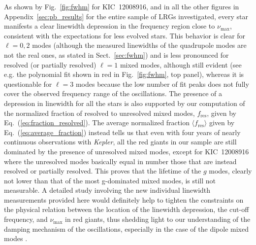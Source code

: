 \documentclass[structabstract]{aa}
\newcommand{\Kepler}{\textit{Kepler}}
\newcommand{\numax}{\nu_\mathrm{max}}
\newcommand{\kic}{KIC~12008916}
\begin{document}
As shown by Fig.~\ref{fig:fwhm} for \kic, and in all the other figures in Appendix~\ref{sec:pb_results} for the entire sample of LRGs investigated, every star manifests a clear linewidth depression in the frequency region close to $\numax$, consistent with the expectations for less evolved stars. This behavior is clear for $\ell = 0, 2$ modes (although the measured linewidths of the quadrupole modes are not the real ones, as stated in Sect.~\ref{sec:fwhm}) and is less pronounced for resolved (or partially resolved) $\ell = 1$ mixed modes, although still evident (see e.g. the polynomial fit shown in red in Fig.~\ref{fig:fwhm}, top panel), whereas it is questionable for $\ell = 3$ modes because the low number of fit peaks does not fully cover the observed frequency range of the oscillations. The presence of a depression in linewidth for all the stars is also supported by our computation of the normalized fraction of resolved to unresolved mixed modes, $f_\mathrm{res}$, given by Eq.~(\ref{eq:fraction_resolved}). The average normalized fraction $\langle f_\mathrm{res} \rangle$ given by Eq.~(\ref{eq:average_fraction}) instead tells us that even with four years of nearly continuous observations with \Kepler, all the red giants in our sample are still dominated by the presence of unresolved mixed modes, except for \kic\,\,where the unresolved modes basically equal in number those that are instead resolved or partially resolved. This proves that the lifetime of the $g$ modes, clearly not lower than that of the most g-dominated mixed modes, is still not measurable. A detailed study involving the new individual linewidth measurements provided here would definitely help to tighten the constraints on the physical relation between the location of the linewidth depression, the cut-off frequency, and $\numax$ in red giants, thus shedding light to our understanding of the damping mechanism of the oscillations, especially in the case of the dipole mixed modes \citep{Grosjean14}.
\end{document}
